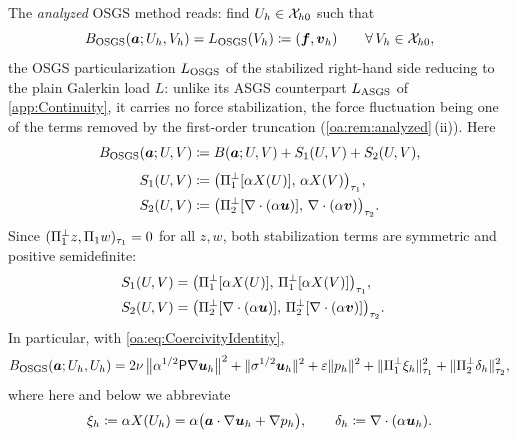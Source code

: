 The \emph{analyzed} OSGS method reads: find $U_h \in \mathcal{X}_{h0}$ such that
\begin{equation}
  \label{oa:eq:Method}
  B_{\mathrm{OSGS}}(\boldsymbol{a}; U_h, V_h) = L_{\mathrm{OSGS}}(V_h) \coloneqq (\boldsymbol{f}, \boldsymbol{v}_h)
  \qquad \forall\, V_h \in \mathcal{X}_{h0},
\end{equation}
the OSGS particularization $L_{\mathrm{OSGS}}$ of the stabilized right{\hyp}hand side reducing to the plain
Galerkin load $L$: unlike its ASGS counterpart $L_{\mathrm{ASGS}}$ of \cref{app:Continuity}, it carries no
force stabilization, the force fluctuation being one of the terms removed by the first{\hyp}order
truncation (\cref{oa:rem:analyzed}\,(ii)). Here
\begin{equation}
  \label{oa:eq:Bosgs}
  B_{\mathrm{OSGS}}(\boldsymbol{a}; U, V)
  \coloneqq
  B(\boldsymbol{a}; U, V) + S_1(U, V) + S_2(U, V),
\end{equation}
\begin{equation}
  \label{oa:eq:Sdefs}
  \begin{aligned}
    S_1(U, V) &\coloneqq \bigl( \Pi_{1}^{\perp}[\alpha X(U)],\, \alpha X(V) \bigr)_{\tau_1}, \\
    S_2(U, V) &\coloneqq \bigl( \Pi_{2}^{\perp}[\nabla\cdot(\alpha\boldsymbol{u})],\, \nabla\cdot(\alpha\boldsymbol{v}) \bigr)_{\tau_2}.
  \end{aligned}
\end{equation}
Since $(\Pi_{1}^{\perp} z, \Pi_{1} w)_{\tau_1} = 0$ for all $z, w$, both stabilization terms are
symmetric and positive semidefinite:
\begin{equation}
  \label{oa:eq:Ssym}
\begin{aligned}
  S_1(U, V) &= \bigl( \Pi_{1}^{\perp}[\alpha X(U)],\, \Pi_{1}^{\perp}[\alpha X(V)] \bigr)_{\tau_1},
  \qquad \\
  S_2(U, V) &= \bigl( \Pi_{2}^{\perp}[\nabla\cdot(\alpha\boldsymbol{u})],\, \Pi_{2}^{\perp}[\nabla\cdot(\alpha\boldsymbol{v})] \bigr)_{\tau_2}.
\end{aligned}
\end{equation}
In particular, with \cref{oa:eq:CoercivityIdentity},
\begin{equation}
  \label{oa:eq:Diagonal}
  B_{\mathrm{OSGS}}(\boldsymbol{a}; U_h, U_h)
  = 2\nu\,\bigl\lVert \alpha^{1/2}\mathsf{P}\nabla\boldsymbol{u}_h \bigr\rVert^2
  + \lVert \sigma^{1/2}\boldsymbol{u}_h \rVert^2
  + \varepsilon\lVert p_h \rVert^2
  + \lVert \Pi_{1}^{\perp} \xi_h \rVert_{\tau_1}^2
  + \lVert \Pi_{2}^{\perp} \delta_h \rVert_{\tau_2}^2,
\end{equation}
where here and below we abbreviate
\begin{equation}
  \label{oa:eq:XiDelta}
  \xi_h \coloneqq \alpha X(U_h) = \alpha\bigl(\boldsymbol{a}\cdot\nabla\boldsymbol{u}_h + \nabla p_h\bigr),
  \qquad
  \delta_h \coloneqq \nabla\cdot(\alpha\boldsymbol{u}_h).
\end{equation}

